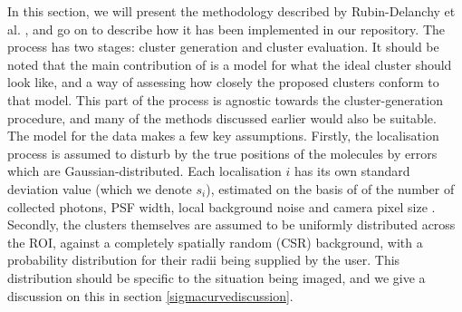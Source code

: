 \documentclass[11pt]{article}
\begin{document}
In this section, we will present the methodology described by Rubin-Delanchy et al. \cite{Rubin-Delanchy2015}, and go on to describe how it has been implemented in our repository. The process has two stages: cluster generation and cluster evaluation. It should be noted that the main contribution of \cite{Rubin-Delanchy2015} is a model for what the ideal cluster should look like, and a way of assessing how closely the proposed clusters conform to that model. This part of the process is agnostic towards the cluster-generation procedure, and many of the methods discussed earlier would also be suitable. \\

The model for the data makes a few key assumptions. Firstly, the localisation process is assumed to disturb by the true positions of the molecules by errors which are Gaussian-distributed. Each localisation $i$ has its own standard deviation value (which we denote $s_i$), estimated on the basis of of the number of collected photons, PSF width, local background noise and camera pixel size \cite{Rubin-Delanchy2015, 25fromRubinDelanchy}.
Secondly, the clusters themselves are assumed to be uniformly distributed across the ROI, against a completely spatially random (CSR) background, with a probability distribution for their radii being supplied by the user. This distribution should be specific to the situation being imaged, and we give a discussion on this in section \ref{sigmacurvediscussion}.\\
\end{document}
